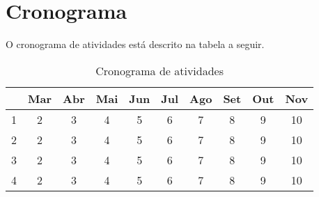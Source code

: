 \chapter{Cronograma}
\label{cap:cronograma}

O cronograma de atividades está descrito na tabela a seguir.

\begin{table}[h!]
    \centering
    \begin{tabular}{|c|c|c|c|c|c|c|c|c|c|}
     \hline
       & Mar & Abr & Mai & Jun & Jul & Ago & Set & Out & Nov \\
     \hline\hline
     1 & 2 & 3 & 4 & 5 & 6 & 7 & 8 & 9 & 10\\
     \hline
     2 & 2 & 3 & 4 & 5 & 6 & 7 & 8 & 9 & 10\\
     \hline
     3 & 2 & 3 & 4 & 5 & 6 & 7 & 8 & 9 & 10\\
     \hline
     4 & 2 & 3 & 4 & 5 & 6 & 7 & 8 & 9 & 10\\
     \hline
    \end{tabular}
    \caption{Cronograma de atividades}
    \label{cronograma-atividades}
\end{table}

